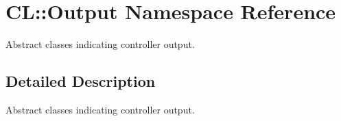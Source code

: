 \hypertarget{namespaceCL_1_1Output}{
\section{CL::Output Namespace Reference}
\label{namespaceCL_1_1Output}
}


Abstract classes indicating controller output.  


\subsection{Detailed Description}
Abstract classes indicating controller output. 